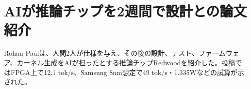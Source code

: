 \section{AIが推論チップを2週間で設計との論文紹介}
Rohan Paulは、人間2人が仕様を与え、その後の設計、テスト、ファームウェア、カーネル生成をAIが担ったとする推論チップRedwoodを紹介した。投稿ではFPGA上で12.1 tok/s、Samsung 8nm想定で49 tok/s・1.335Wなどの試算が示された。

